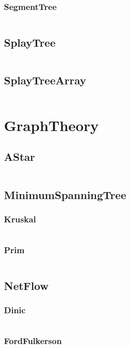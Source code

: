 \documentclass[a4paper,11pt]{article}
\begin{document}
\subsubsection{SegmentTree}
\inputminted[breaklines]{c++}{03++DataStructure/+SegmentTree/+SegmentTree.cpp}

\subsection{SplayTree}
\inputminted[breaklines]{c++}{03++DataStructure/+SplayTree.cpp}
\subsection{SplayTreeArray}
\inputminted[breaklines]{c++}{03++DataStructure/+SplayTreeArray.cpp}

\newpage
\section{GraphTheory}
\subsection{AStar}
\inputminted[breaklines]{c++}{04++GraphTheory/+AStar.cpp}
\subsection{MinimumSpanningTree}
\subsubsection{Kruskal}
\inputminted[breaklines]{c++}{04++GraphTheory/+MinimumSpanningTree/+Kruskal.cpp}
\subsubsection{Prim}
\inputminted[breaklines]{c++}{04++GraphTheory/+MinimumSpanningTree/+Prim.cpp}

\subsection{NetFlow}
\subsubsection{Dinic}
\inputminted[breaklines]{c++}{04++GraphTheory/+NetFlow/+Dinic.cpp}
\subsubsection{FordFulkerson}
\inputminted[breaklines]{c++}{04++GraphTheory/+NetFlow/+FordFulkerson.cpp}
\end{document}
